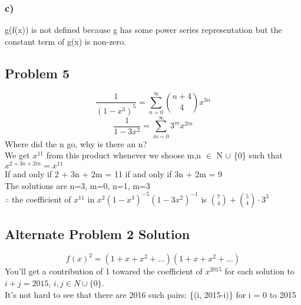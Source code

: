 \documentclass[12pt]{article}
\begin{document}
	\subsubsection*{c)}
	
	g(f(x)) is not defined because g has some power series representation but the constant term of g(x) is non-zero.
	
	\subsection*{Problem 5}
	$$\frac{1}{(1-x^3)^5} = \sum_{n=0}^{\infty}{n+4 \choose 4}x^{3n}$$
	$$\frac{1}{1-3x^2} = \sum_{m=0}^{\infty}3^mx^{2m}$$
	Where did the n go, why is there an n?\\
	
	We get $x^{11}$ from this product whenever we shoose m,n $\in$ N $\cup$ \{0\} such that $x^{2+3n+2m} = x^11$\\
	If and only if 2 + 3n + 2m = 11 if and only if 3n + 2m = 9\\
	The solutions are n=3, m=0, n=1, m=3\\
	$\therefore$ the coefficient of $x^11$ in $x^2(1-x^3)^{-5}(1-3x^2)^{-1}$ is ${7 \choose 4} + {5 \choose 4} \cdot 3^3$\\
	
	\subsection*{Alternate Problem 2 Solution}
	$$f(x)^2 = (1+x+x^2 + ...)(1+x+x^2+ ...)$$
	You'll get a contribution of 1 towarsd the coefficient of $x^{2015}$ for each solution to $i+j=2015$, $i,j \in N \cup\{0\}$.\\
	It's not hard to see that there are 2016 such pairs: \{(i, 2015-i)\} for i = 0 to 2015\\
	
	
	
\end{document}
